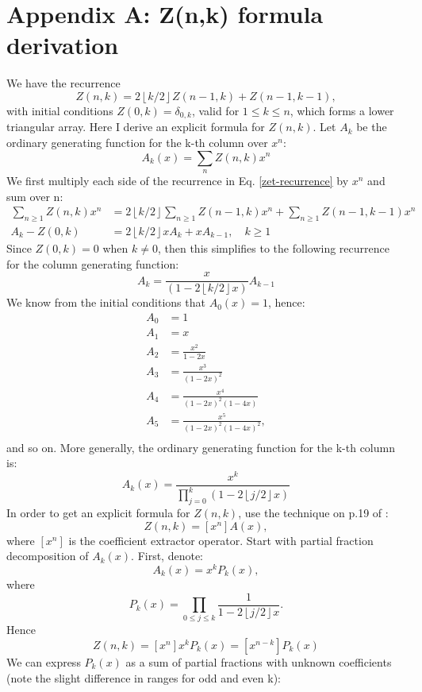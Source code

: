 \documentclass{article}
\newcommand{\floor}[1]{\left\lfloor #1 \right\rfloor}
\begin{document}
\section*{Appendix A: Z(n,k) formula derivation}
We have the recurrence
\begin{equation}\label{zet-recurrence}
Z(n,k) = 2\floor{k/2} Z(n-1,k)+Z(n-1,k-1),
\end{equation}
with initial conditions $Z(0,k) = \delta_{0,k}$, valid for $1 \leq k \leq n$, which forms a lower triangular array. 
Here I derive an explicit formula for $Z(n,k)$. Let $A_k$ be the ordinary generating function for the k-th column over $x^n$:
$$
A_k(x) = \sum_{n} Z(n,k) x^n
$$
We first multiply each side of the recurrence in Eq. \ref{zet-recurrence} by $x^n$ and sum over n:
$$
\begin{aligned}
\sum_{n \geq 1} Z(n,k)x^n &= 2\floor{k/2}\sum_{n \geq 1}Z(n-1,k)x^n + \sum_{n \geq 1} Z(n-1,k-1) x^n \\
A_k -Z(0,k)&=2\floor{k/2}x A_k+x A_{k-1}, \quad k \geq 1
\end{aligned}
$$
Since $Z(0,k) = 0$ when $k \neq 0$, then this simplifies to the following recurrence for the column generating function:
$$
A_k = \frac{x}{(1-2\floor{k/2}x)} A_{k-1}
$$
We know from the initial conditions that $A_0(x) = 1$, hence:
$$
\begin{aligned}
    A_0 &= 1 \\
    A_1 &= x \\
    A_2 &= \frac{x^2}{1-2x} \\
    A_3 &= \frac{x^3}{(1-2x)^2} \\
    A_4 &= \frac{x^4}{(1-2x)^2 (1-4x)} \\
    A_5 &= \frac{x^5}{(1-2x)^2 (1-4x)^2}, \\
\end{aligned}
$$
and so on. More generally, the ordinary generating function for the k-th column is:
\begin{equation}\label{column-ogf}
A_k(x) = \frac{x^k}{\prod_{j=0}^k(1-2\floor{j/2}x)}
\end{equation}
In order to get an explicit formula for $Z(n,k)$, use the technique on p.19 of \cite{wilfGeneratingfunctionologyThirdEdition2005}:
$$
Z(n,k) = [x^n]A(x),
$$
where $[x^n]$ is the coefficient extractor operator. Start with partial fraction decomposition of $A_k(x)$. First, denote:
$$
A_k(x) = x^kP_k(x),
$$
where
$$
P_k(x) = \prod_{0 \leq j \leq k}\frac{1}{1-2\floor{j/2}x}.
$$
Hence
\begin{equation}\label{znk-coef}
Z(n,k) = [x^n]x^kP_k(x) = [x^{n-k}]P_k(x)
\end{equation}
We can express $P_k(x)$ as a sum of partial fractions with unknown coefficients (note the slight difference in ranges for odd and even k):
\end{document}
